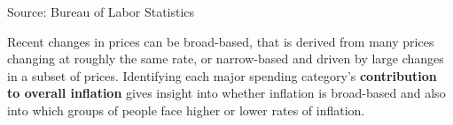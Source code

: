 \documentclass{report}
\makeatletter
\newcommand{\tbllink}[1]{\href{https://raw.githubusercontent.com/bdecon/US-chartbook/master/chartbook/data/#1}{\faTable}}
\newcommand*\short[1]{\expandafter\@gobbletwo\number\numexpr#1\relax}
\newcommand{\dateaxisticks}{
		date coordinates in=x, axis line style={draw=none},
		xmax={2024-01-31},
		max space between ticks=40,	    
		xtick={{1990-01-01}, {1992-01-01}, {1994-01-01}, 
			{1996-01-01}, {1998-01-01}, {2000-01-01}, 
			{2002-01-01}, {2004-01-01}, {2006-01-01},
			{2008-01-01}, {2010-01-01}, {2012-01-01}, {2014-01-01},
		    {2016-01-01}, {2018-01-01}, {2020-01-01}, {2022-01-01}, 
		    {2024-01-01}, {2026-01-01}},
		minor xtick={{1989-01-01}, {1991-01-01}, {1993-01-01},
			{1995-01-01}, {1997-01-01}, {1999-01-01}, 
			{2001-01-01}, {2003-01-01}, {2005-01-01}, {2007-01-01},
		    {2009-01-01}, {2011-01-01}, {2013-01-01}, {2015-01-01},
		    {2017-01-01}, {2019-01-01}, {2021-01-01}, {2023-01-01}, 
		    {2025-01-01}, {2027-01-01}},
		enlarge y limits={0.06}, enlarge x limits={0.01},
		xticklabel style={align=center, yshift=-2pt}, tick label style={inner sep=0pt},
		}
\newcommand{\bbar}[2]{extra #1 ticks = {{#2}}, extra #1 tick labels = ,
		extra #1 tick style = {grid=major, grid style={thick, black!25}},}
\newcommand{\stdline}[4]{\addplot[very thick, no markers, color=#1] 
		table [x=#2, y=#3, col sep=comma] {#4};	}
\newcommand{\rbars}{
		\fill[color=black!10] (axis cs:{1990-07-01},\pgfkeysvalueof{/pgfplots/ymin})
			rectangle (axis cs:{1991-03-01}, \pgfkeysvalueof{/pgfplots/ymax});
		\fill[color=black!10] (axis cs:{2007-12-01},\pgfkeysvalueof{/pgfplots/ymin})
			rectangle (axis cs:{2009-07-01}, \pgfkeysvalueof{/pgfplots/ymax});
		\fill[color=black!10] (axis cs:{2001-03-01},\pgfkeysvalueof{/pgfplots/ymin})
			rectangle (axis cs:{2001-11-01}, \pgfkeysvalueof{/pgfplots/ymax});
		\fill[color=black!10] (axis cs:{2020-02-01},\pgfkeysvalueof{/pgfplots/ymin})
			rectangle (axis cs:{2020-05-01}, \pgfkeysvalueof{/pgfplots/ymax});}
\makeatother
\begin{document}
{\begin{minipage}{1.0\textwidth}
\hspace{3mm} 

\footnotesize{Source: Bureau of Labor Statistics} \hfill \tbllink{cpi.csv}
\vspace{2mm}

\small Recent changes in prices can be broad-based, that is derived from many prices changing at roughly the same rate, or narrow-based and driven by large changes in a subset of prices. Identifying each major spending category's \textbf{contribution to overall inflation} gives insight into whether inflation is broad-based and also into which groups of people face higher or lower rates of inflation.
\end{minipage}

}
\end{document}
